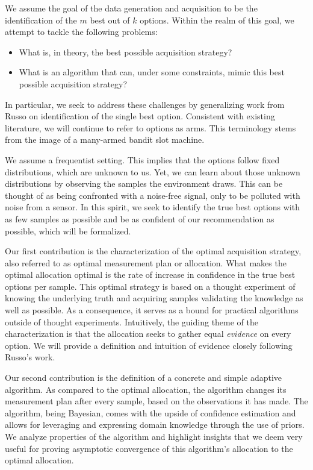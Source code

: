 We assume the goal of the data generation and acquisition to be the
identification of the $m$ best out of $k$ options. Within the realm of this
goal, we attempt to tackle the following problems:
\begin{itemize}
  \item What is, in theory, the best possible acquisition strategy?
  \item What is an algorithm that can, under some constraints, mimic this best possible acquisition strategy?
\end{itemize}
In particular, we seek to address these challenges by generalizing work from
Russo \cite{DBLP:journals/corr/Russo16} on identification of the single best
option. Consistent with existing literature, we will continue to refer to
options as arms. This terminology stems from the image of a many-armed bandit
slot machine.

We assume a frequentist setting. This implies that the options follow fixed
distributions, which are unknown to us. Yet, we can learn about those unknown
distributions by observing the samples the environment draws. This can be
thought of as being confronted with a noise-free signal, only to be polluted
with noise from a sensor. In this spirit, we seek to identify the true best
options with as few samples as possible and be as confident of our
recommendation as possible, which will be formalized.

Our first contribution is the characterization of the optimal acquisition
strategy, also referred to as optimal measurement plan or allocation. What makes
the optimal allocation optimal is the rate of increase in confidence in the true
best options per sample. This optimal strategy is based on a thought experiment
of knowing the underlying truth and acquiring samples validating the knowledge
as well as possible. As a consequence, it serves as a bound for practical
algorithms outside of thought experiments. Intuitively, the guiding theme of the
characterization is that the allocation seeks to gather equal \emph{evidence} on
every option. We will provide a definition and intuition of evidence closely
following Russo's work.

Our second contribution is the definition of a concrete and simple adaptive
algorithm. As compared to the optimal allocation, the algorithm changes its
measurement plan after every sample, based on the observations it has made. The
algorithm, being Bayesian, comes with the upside of confidence estimation and
allows for leveraging and expressing domain knowledge through the use of priors.
We analyze properties of the algorithm and highlight insights that we deem very
useful for proving asymptotic convergence of this algorithm's allocation to the
optimal allocation.

